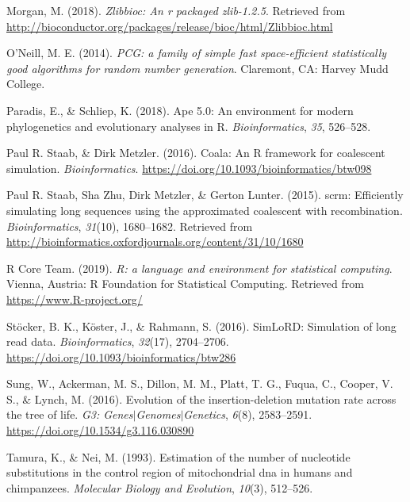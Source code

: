 \documentclass[12pt,]{article}
\begin{document}
\leavevmode\hypertarget{ref-Morgan_2018}{}%
Morgan, M. (2018). \emph{Zlibbioc: An r packaged zlib-1.2.5}. Retrieved from \url{http://bioconductor.org/packages/release/bioc/html/Zlibbioc.html}

\leavevmode\hypertarget{ref-Oneill_2014pcg}{}%
O'Neill, M. E. (2014). \emph{PCG: a family of simple fast space-efficient statistically good algorithms for random number generation}. Claremont, CA: Harvey Mudd College.

\leavevmode\hypertarget{ref-Paradis_2018}{}%
Paradis, E., \& Schliep, K. (2018). Ape 5.0: An environment for modern phylogenetics and evolutionary analyses in R. \emph{Bioinformatics}, \emph{35}, 526--528.

\leavevmode\hypertarget{ref-Paul_R._Staab_2016}{}%
Paul R. Staab, \& Dirk Metzler. (2016). Coala: An R framework for coalescent simulation. \emph{Bioinformatics}. \url{https://doi.org/10.1093/bioinformatics/btw098}

\leavevmode\hypertarget{ref-Paul_R._Staab_2015}{}%
Paul R. Staab, Sha Zhu, Dirk Metzler, \& Gerton Lunter. (2015). scrm: Efficiently simulating long sequences using the approximated coalescent with recombination. \emph{Bioinformatics}, \emph{31}(10), 1680--1682. Retrieved from \url{http://bioinformatics.oxfordjournals.org/content/31/10/1680}

\leavevmode\hypertarget{ref-R_Core_Team_2019}{}%
R Core Team. (2019). \emph{R: a language and environment for statistical computing}. Vienna, Austria: R Foundation for Statistical Computing. Retrieved from \url{https://www.R-project.org/}

\leavevmode\hypertarget{ref-St_cker_2016}{}%
Stöcker, B. K., Köster, J., \& Rahmann, S. (2016). SimLoRD: Simulation of long read data. \emph{Bioinformatics}, \emph{32}(17), 2704--2706. \url{https://doi.org/10.1093/bioinformatics/btw286}

\leavevmode\hypertarget{ref-Sung_2016}{}%
Sung, W., Ackerman, M. S., Dillon, M. M., Platt, T. G., Fuqua, C., Cooper, V. S., \& Lynch, M. (2016). Evolution of the insertion-deletion mutation rate across the tree of life. \emph{G3: Genes\(\vert\)Genomes\(\vert\)Genetics}, \emph{6}(8), 2583--2591. \url{https://doi.org/10.1534/g3.116.030890}

\leavevmode\hypertarget{ref-TN93}{}%
Tamura, K., \& Nei, M. (1993). Estimation of the number of nucleotide substitutions in the control region of mitochondrial dna in humans and chimpanzees. \emph{Molecular Biology and Evolution}, \emph{10}(3), 512--526.
\end{document}
